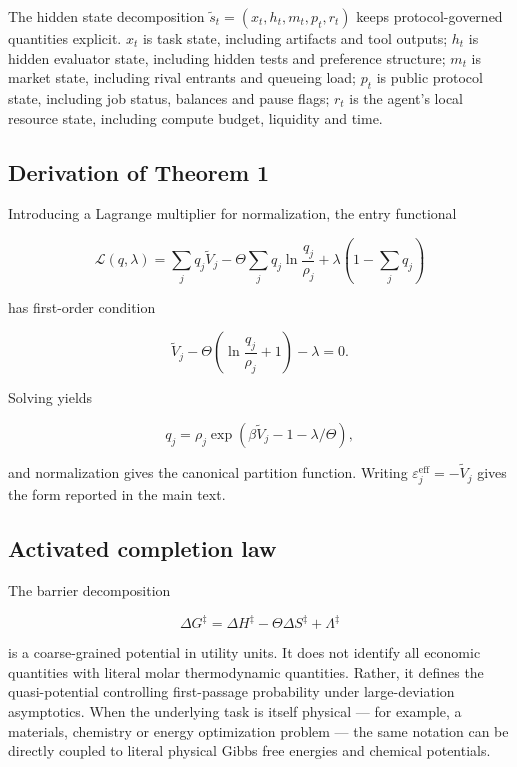 The hidden state decomposition \(\tilde s_t=(x_t,h_t,m_t,p_t,r_t)\)
keeps protocol-governed quantities explicit. \(x_t\) is task state,
including artifacts and tool outputs; \(h_t\) is hidden evaluator state,
including hidden tests and preference structure; \(m_t\) is market
state, including rival entrants and queueing load; \(p_t\) is public
protocol state, including job status, balances and pause flags; \(r_t\)
is the agent's local resource state, including compute budget, liquidity
and time.

\subsection{Derivation of Theorem 1}\label{derivation-of-theorem-1}

Introducing a Lagrange multiplier for normalization, the entry
functional

\[
\mathcal{L}(q,\lambda) = \sum_j q_j\widetilde V_j - \Theta\sum_j q_j\ln\frac{q_j}{\rho_j} + \lambda\left(1-\sum_j q_j\right)
\]

has first-order condition

\[
\widetilde V_j - \Theta\left(\ln\frac{q_j}{\rho_j}+1\right) - \lambda = 0.
\]

Solving yields

\[
q_j = \rho_j\exp\!\left(\beta \widetilde V_j -1 - \lambda/\Theta\right),
\]

and normalization gives the canonical partition function. Writing
\(\varepsilon_j^{\mathrm{eff}}=-\widetilde V_j\) gives the form reported
in the main text.

\subsection{Activated completion law}\label{activated-completion-law}

The barrier decomposition

\[
\Delta G^{\ddagger} = \Delta H^{\ddagger} - \Theta\Delta S^{\ddagger} + \Lambda^{\ddagger}
\]

is a coarse-grained potential in utility units. It does not identify all
economic quantities with literal molar thermodynamic quantities. Rather,
it defines the quasi-potential controlling first-passage probability
under large-deviation asymptotics. When the underlying task is itself
physical --- for example, a materials, chemistry or energy optimization
problem --- the same notation can be directly coupled to literal
physical Gibbs free energies and chemical potentials.

